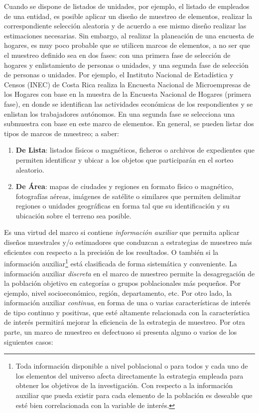 \documentclass[
  12pt,
]{book}
\providecommand{\tightlist}{%
  \setlength{\itemsep}{0pt}\setlength{\parskip}{0pt}}
\begin{document}
Cuando se dispone de listados de unidades, por ejemplo, el listado de empleados de una entidad, es posible aplicar un diseño de muestreo de elementos, realizar la correspondiente selección aleatoria y de acuerdo a ese mismo diseño realizar las estimaciones necesarias. Sin embargo, al realizar la planeación de una encuesta de hogares, es muy poco probable que se utilicen marcos de elementos, a no ser que el muestreo definido sea en dos fases: con una primera fase de selección de hogares y enlistamiento de personas o unidades, y una segunda fase de selección de personas o unidades. Por ejemplo, el Instituto Nacional de Estadística y Censos (INEC) de Costa Rica realiza la Encuesta Nacional de Microempresas de los Hogares con base en la muestra de la Encuesta Nacional de Hogares (primera fase), en donde se identifican las actividades económicas de los respondientes y se enlistan los trabajadores autónomos. En una segunda fase se selecciona una submuestra con base en este marco de elementos. En general, se pueden listar dos tipos de marcos de muestreo; a saber:

\begin{enumerate}
\def\labelenumi{\arabic{enumi}.}
\tightlist
\item
  \textbf{De Lista}: listados físicos o magnéticos, ficheros o archivos de expedientes que permiten identificar y ubicar a los objetos que participarán en el sorteo aleatorio.
\item
  \textbf{De Área}: mapas de ciudades y regiones en formato físico o magnético, fotografías aéreas, imágenes de satélite o similares que permiten delimitar regiones o unidades geográficas en forma tal que su identificación y su ubicación sobre el terreno sea posible.
\end{enumerate}

Es una virtud del marco si contiene \emph{información auxiliar} que permita aplicar diseños muestrales y/o estimadores que conduzcan a estrategias de muestreo más eficientes con respecto a la precisión de los resultados. O también si la información auxiliar\footnote{Toda información disponible a nivel poblacional o para todos y cada uno de los elementos del universo afecta directamente la estrategia empleada para obtener los objetivos de la investigación. Con respecto a la información auxiliar que pueda existir para cada elemento de la población es deseable que esté bien correlacionada con la variable de interés.} está clasificada de forma sistemática y conveniente. La información auxiliar \emph{discreta} en el marco de muestreo permite la desagregación de la población objetivo en categorías o grupos poblacionales más pequeños. Por ejemplo, nivel socioeconómico, región, departamento, etc. Por otro lado, la información auxiliar \emph{continua}, en forma de una o varias características de interés de tipo continuo y positivas, que esté altamente relacionada con la característica de interés permitirá mejorar la eficiencia de la estrategia de muestreo. Por otra parte, un marco de muestreo es defectuoso si presenta alguno o varios de los siguientes casos:
\end{document}
